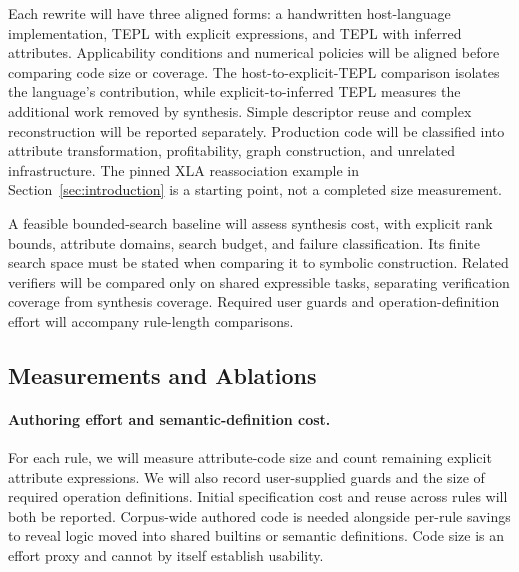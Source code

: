 Each rewrite will have three aligned forms: a handwritten host-language
implementation, TEPL with explicit  expressions, and TEPL with
inferred attributes. Applicability conditions and numerical policies will
be aligned before comparing code size or coverage. The host-to-explicit-TEPL
comparison isolates the language's contribution, while explicit-to-inferred
TEPL measures the additional work removed by synthesis. Simple descriptor
reuse and complex reconstruction will be reported separately. Production
code will be classified into attribute transformation, profitability, graph
construction, and unrelated infrastructure. The pinned XLA reassociation
example in Section~\ref{sec:introduction} is a starting point, not a
completed size measurement. 

A feasible bounded-search baseline will assess synthesis cost, with explicit
rank bounds, attribute domains, search budget, and failure classification.
Its finite search space must be stated when comparing it to symbolic
construction. Related verifiers will be compared only on shared expressible
tasks, separating verification coverage from synthesis coverage. Required
user guards and operation-definition effort will accompany rule-length
comparisons. 

\FloatBarrier
\subsection{Measurements and Ablations}
\paragraph{Authoring effort and semantic-definition cost.}
For each rule, we will measure attribute-code size and count remaining explicit
attribute expressions. We will also record user-supplied guards and the size
of required operation definitions. Initial specification cost and reuse across
rules will both be reported. Corpus-wide authored code is needed alongside
per-rule savings to reveal logic moved into shared builtins or semantic
definitions. Code size is an effort proxy and cannot by itself establish
usability. 

